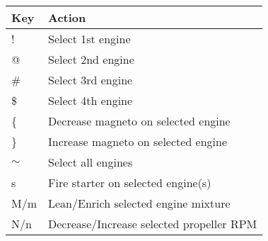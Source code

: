 \begin{tabular}{|l|l|}\hline
Key      &  Action\\ \hline
   !     & Select 1st engine\\
   @	 & Select 2nd engine\\
  \#     & Select 3rd engine\\
  \$     & Select 4th engine\\
  \{     & Decrease magneto on selected engine\\
  \}     & Increase magneto on selected engine\\
  $\sim$ & Select all engines\\\hline
   s     & Fire starter on selected engine(s)\\
  M/m    & Lean/Enrich selected engine mixture\\
  N/n    & Decrease/Increase selected propeller RPM\\\hline
\end{tabular}

